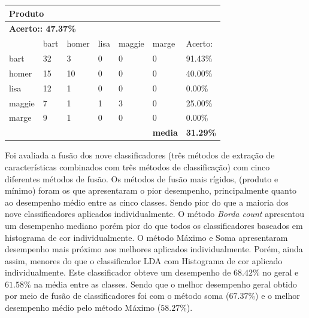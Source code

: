 \documentclass[journal]{IEEEtran}
\begin{document}
\begin{table}[!htb]
\begin{tabular}{l|l|l|l|l|l|l}
\multicolumn{7}{l}{\textbf{Produto}}                                                        \\ \hline
\multicolumn{7}{l}{\textbf{Acerto:: 47.37\%}}                                                 \\ \hline
          & bart      & homer     & lisa      & maggie    & marge          & Acerto:            \\ \hline
bart      & 32        & 3         & 0         & 0         & 0              & 91.43\%          \\ \hline
homer     & 15        & 10        & 0         & 0         & 0              & 40.00\%          \\ \hline
lisa      & 12        & 1         & 0         & 0         & 0              & 0.00\%           \\ \hline
maggie    & 7         & 1         & 1         & 3         & 0              & 25.00\%          \\ \hline
marge     & 9         & 1         & 0         & 0         & 0              & 0.00\%           \\ \hline
\textbf{} & \textbf{} & \textbf{} & \textbf{} & \textbf{} & \textbf{media} & \textbf{31.29\%} \\ \hline
\end{tabular}
\end{table}

Foi avaliada a fusão dos nove classificadores (três métodos de extração de características combinados com três métodos de classificação) com cinco diferentes métodos de fusão.
Os métodos de fusão mais rígidos, (produto e mínimo) foram os que apresentaram o pior desempenho, principalmente quanto ao desempenho médio entre as cinco classes. Sendo pior do que a maioria dos nove classificadores aplicados individualmente.
O método {\it Borda count} apresentou um desempenho mediano porém pior do que todos os classificadores baseados em histograma de cor individualmente.
O método Máximo e Soma apresentaram desempenho mais próximo aos melhores aplicados individualmente.
Porém, ainda assim, menores do que o classificador LDA com Histograma de cor aplicado individualmente.
Este classificador obteve um desempenho de $68.42\%$ no geral e $61.58\%$ na média entre as classes.
Sendo que o melhor desempenho geral obtido por meio de fusão de classificadores foi com o método soma ($67.37\%$) e o melhor desempenho médio pelo método Máximo ($58.27\%$).
\end{document}
